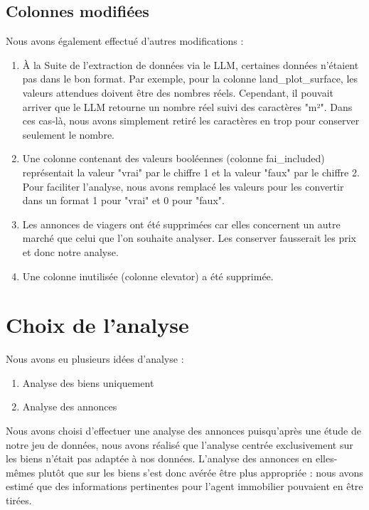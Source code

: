 \documentclass[a4paper, 12pt, twoside]{report}
\begin{document}
		\subsection{Colonnes modifiées}

		Nous avons également effectué d'autres modifications :
		\begin{enumerate}
			\item À la Suite de l'extraction de données via le LLM, certaines données n'étaient pas dans le bon format. Par exemple, pour la colonne land\_plot\_surface, les valeurs attendues doivent être des nombres réels. Cependant, il pouvait arriver que le LLM retourne un nombre réel suivi des caractères "m²". Dans ces cas-là, nous avons simplement retiré les caractères en trop pour conserver seulement le nombre.
			\item Une colonne contenant des valeurs booléennes (colonne fai\_included) représentait la valeur "vrai" par le chiffre 1 et la valeur "faux" par le chiffre 2. Pour faciliter l'analyse, nous avons remplacé les valeurs pour les convertir dans un format 1 pour "vrai" et 0 pour "faux". 
			\item Les annonces de viagers ont été supprimées car elles concernent un autre marché que celui que l'on souhaite analyser. Les conserver fausserait les prix et donc notre analyse.
			\item Une colonne inutilisée (colonne elevator) a été supprimée.
		\end{enumerate}

	\section{Choix de l’analyse}

	Nous avons eu plusieurs idées d'analyse :
	\begin{enumerate}
		\item Analyse des biens uniquement
		\item Analyse des annonces \\
	\end{enumerate}

	Nous avons choisi d'effectuer une analyse des annonces puisqu'après une étude de notre jeu de données, nous avons réalisé que l’analyse centrée exclusivement sur les biens n’était pas adaptée à nos données. L'analyse des annonces en elles-mêmes plutôt que sur les biens s'est donc avérée être plus appropriée : nous avons estimé que des informations pertinentes pour l'agent immobilier pouvaient en être tirées. \\
\end{document}
